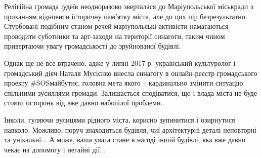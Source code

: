 Релігійна громада іудеїв неодноразово зверталася до Маріупольської міськради з
проханням відновити історичну пам'ятку міста, але до цих пір безрезультатно.
Стурбовані подібним станом речей маріупольські активісти намагаються проводити
суботники та арт-заходи на території синагоги, таким чином привертаючи увагу
громадськості до зруйнованої будівлі.

Однак ще не все втрачено, адже у липні 2017 р. український культуролог і
громадський діяч Наталя Мусієнко внесла синагогу в онлайн-реєстр громадського
проекту \#SOSмайбутнє, головна мета якого – кардинально змінити ситуацію
спільними зусиллями громади. Залишається сподіватися, що і влада міста не буде
стояти осторонь від вже давно наболілої проблеми.

Інколи, гуляючи вулицями рідного міста, корисно зупинитися і озирнутися
навколо. Можливо, поруч знаходиться будівля, чиї архітектурні деталі неповторні
та унікальні... А може, ваша увага стане в нагоді іншій будівлі, яка вже давно
чекає на допомогу і негайні дії...

